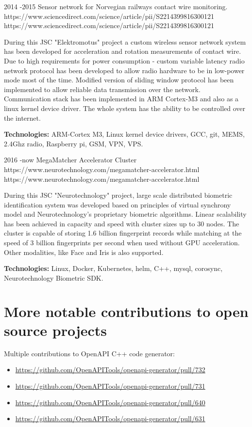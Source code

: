 \documentclass[12]{article}
\begin{document}
\job
{2014 -}{2015}
{Sensor network for Norvegian railways contact wire monitoring.}
{https://www.sciencedirect.com/science/article/pii/S2214399816300121}
{https://www.sciencedirect.com/science/article/pii/S2214399816300121}
{
During this JSC "Elektromotus" project a custom wireless sensor network system has been developed for acceleration and rotation measurements of contact wire.
Due to high requirements for power consumption - custom variable latency radio network protocol has been developed to allow radio hardware to be in low-power mode most of the time.
Modified version of sliding window protocol has been implemented to allow reliable data transmission over the network.
Communication stack has been implemented in ARM Cortex-M3 and also as a linux kernel device driver.
The whole system has the ability to be controlled over the internet.\\
\rule{0mm}{5mm}\textbf{Technologies:} ARM-Cortex M3, Linux kernel device drivers, GCC, git, MEMS, 2.4Ghz radio, Raspberry pi, GSM, VPN, VPS.}

\job
{2016 -}{now}
{MegaMatcher Accelerator Cluster}
{https://www.neurotechnology.com/megamatcher-accelerator.html}
{https://www.neurotechnology.com/megamatcher-accelerator.html}
{
During this JSC "Neurotechnology" project, large scale distributed biometric identification system was developed based on principles of virtual synchrony model and Neurotechnology's proprietary biometric algorithms.
Linear scalability has been achieved in capacity and speed with cluster sizes up to 30 nodes.
The cluster is capable of storing 1.6 billion fingerprint records while matching at the speed of 3 billion fingerprints per second when used without GPU acceleration.
Other modalities, like Face and Iris is also supported.\\
\rule{0mm}{5mm}\textbf{Technologies:} Linux, Docker, Kubernetes, helm, C++, mysql, corosync, Neurotechnology Biometric SDK.}

\section{More notable contributions to open source projects}

{
Multiple contributions to OpenAPI C++ code generator:
\begin{itemize}
	\item \url{https://github.com/OpenAPITools/openapi-generator/pull/732}
	\item \url{https://github.com/OpenAPITools/openapi-generator/pull/731}
	\item \url{https://github.com/OpenAPITools/openapi-generator/pull/640}
	\item \url{https://github.com/OpenAPITools/openapi-generator/pull/631}
\end{itemize}
}
\end{document}
